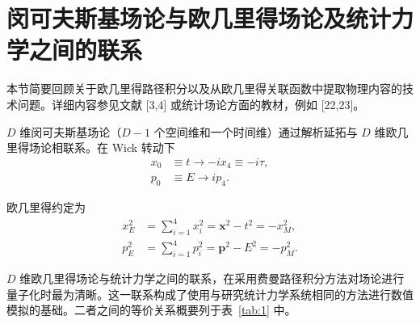 \chapter{闵可夫斯基场论与欧几里得场论及统计力学之间的联系}

本节简要回顾关于欧几里得路径积分以及从欧几里得关联函数中提取物理内容的技术问题。详细内容参见文献 [3,4] 或统计场论方面的教材，例如 [22,23]。

$D$ 维闵可夫斯基场论（$D-1$ 个空间维和一个时间维）通过解析延拓与 $D$ 维欧几里得场论相联系。在 Wick 转动下
\begin{equation}
\begin{aligned}
x_0 &\equiv t \to -i x_4 \equiv -i\tau , \\
p_0 &\equiv E \to i p_4 .
\end{aligned}
\label{eq:5.1}
\end{equation}

欧几里得约定为
\begin{equation}
\begin{aligned}
x_E^2 &= \sum_{i=1}^{4} x_i^2 = \mathbf{x}^2 - t^2 = -x_M^2 , \\
p_E^2 &= \sum_{i=1}^{4} p_i^2 = \mathbf{p}^2 - E^2 = -p_M^2 .
\end{aligned}
\label{eq:5.2}
\end{equation}

$D$ 维欧几里得场论与统计力学之间的联系，在采用费曼路径积分方法对场论进行量子化时最为清晰。这一联系构成了使用与研究统计力学系统相同的方法进行数值模拟的基础。二者之间的等价关系概要列于表~\ref{tab:1} 中。

